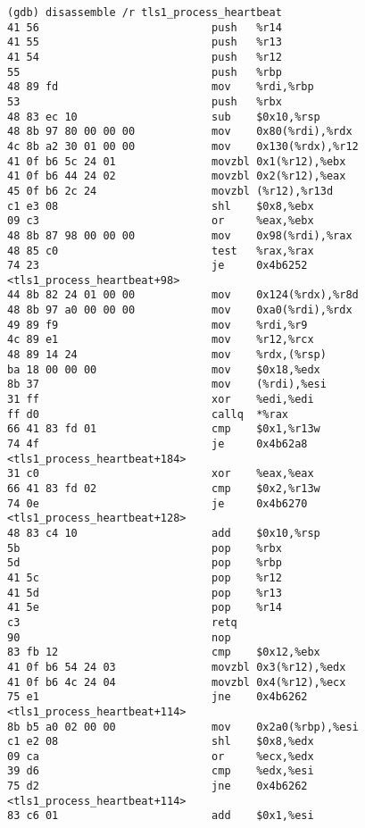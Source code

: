 \begin{lstlisting}
(gdb) disassemble /r tls1_process_heartbeat
41 56                           push   %r14
41 55                           push   %r13
41 54                           push   %r12
55                              push   %rbp
48 89 fd                        mov    %rdi,%rbp
53                              push   %rbx
48 83 ec 10                     sub    $0x10,%rsp
48 8b 97 80 00 00 00            mov    0x80(%rdi),%rdx
4c 8b a2 30 01 00 00            mov    0x130(%rdx),%r12
41 0f b6 5c 24 01               movzbl 0x1(%r12),%ebx
41 0f b6 44 24 02               movzbl 0x2(%r12),%eax
45 0f b6 2c 24                  movzbl (%r12),%r13d
c1 e3 08                        shl    $0x8,%ebx
09 c3                           or     %eax,%ebx
48 8b 87 98 00 00 00            mov    0x98(%rdi),%rax
48 85 c0                        test   %rax,%rax
74 23                           je     0x4b6252 <tls1_process_heartbeat+98>
44 8b 82 24 01 00 00            mov    0x124(%rdx),%r8d
48 8b 97 a0 00 00 00            mov    0xa0(%rdi),%rdx
49 89 f9                        mov    %rdi,%r9
4c 89 e1                        mov    %r12,%rcx
48 89 14 24                     mov    %rdx,(%rsp)
ba 18 00 00 00                  mov    $0x18,%edx
8b 37                           mov    (%rdi),%esi
31 ff                           xor    %edi,%edi
ff d0                           callq  *%rax
66 41 83 fd 01                  cmp    $0x1,%r13w
74 4f                           je     0x4b62a8 <tls1_process_heartbeat+184>
31 c0                           xor    %eax,%eax
66 41 83 fd 02                  cmp    $0x2,%r13w
74 0e                           je     0x4b6270 <tls1_process_heartbeat+128>
48 83 c4 10                     add    $0x10,%rsp
5b                              pop    %rbx
5d                              pop    %rbp
41 5c                           pop    %r12
41 5d                           pop    %r13
41 5e                           pop    %r14
c3                              retq
90                              nop
83 fb 12                        cmp    $0x12,%ebx
41 0f b6 54 24 03               movzbl 0x3(%r12),%edx
41 0f b6 4c 24 04               movzbl 0x4(%r12),%ecx
75 e1                           jne    0x4b6262 <tls1_process_heartbeat+114>
8b b5 a0 02 00 00               mov    0x2a0(%rbp),%esi
c1 e2 08                        shl    $0x8,%edx
09 ca                           or     %ecx,%edx
39 d6                           cmp    %edx,%esi
75 d2                           jne    0x4b6262 <tls1_process_heartbeat+114>
83 c6 01                        add    $0x1,%esi

\end{lstlisting}

